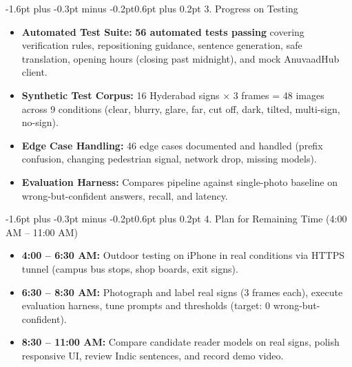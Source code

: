 \documentclass[10pt,a4paper]{article}
\makeatletter
\renewcommand{\section}{\@startsection{section}{1}{\z@}%
  {-1.6pt plus -0.3pt minus -0.2pt}{0.6pt plus 0.2pt}%
  {\normalfont\footnotesize\bfseries\scshape}}
\makeatother
\begin{document}
\section{3. Progress on Testing}
\begin{itemize}\setlength{\itemsep}{0.1pt}\setlength{\topsep}{0.1pt}\setlength{\leftmargin}{1.1em}
  \item \textbf{Automated Test Suite:} \textbf{56 automated tests passing} covering verification rules, repositioning guidance, sentence generation, safe translation, opening hours (closing past midnight), and mock AnuvaadHub client.
  \item \textbf{Synthetic Test Corpus:} 16 Hyderabad signs $\times$ 3 frames = 48 images across 9 conditions (clear, blurry, glare, far, cut off, dark, tilted, multi-sign, no-sign).
  \item \textbf{Edge Case Handling:} 46 edge cases documented and handled (prefix confusion, changing pedestrian signal, network drop, missing models).
  \item \textbf{Evaluation Harness:} Compares pipeline against single-photo baseline on wrong-but-confident answers, recall, and latency.
\end{itemize}

\vspace{-2pt}
\section{4. Plan for Remaining Time (4:00 AM -- 11:00 AM)}
\begin{itemize}\setlength{\itemsep}{0.1pt}\setlength{\topsep}{0.1pt}\setlength{\leftmargin}{1.1em}
  \item \textbf{4:00 -- 6:30 AM:} Outdoor testing on iPhone in real conditions via HTTPS tunnel (campus bus stops, shop boards, exit signs).
  \item \textbf{6:30 -- 8:30 AM:} Photograph and label real signs (3 frames each), execute evaluation harness, tune prompts and thresholds (target: 0 wrong-but-confident).
  \item \textbf{8:30 -- 11:00 AM:} Compare candidate reader models on real signs, polish responsive UI, review Indic sentences, and record demo video.
\end{itemize}
\end{document}
